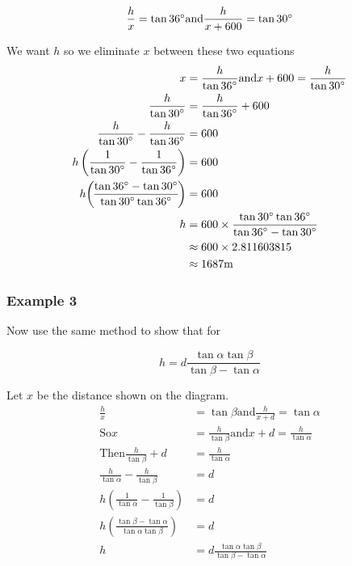 \begin{equation*}\frac{h}{x} =\tan  36 \mbox{{\ensuremath{{}^\circ}}}\text{and}\frac{h}{x +600} =\tan  30 \mbox{{\ensuremath{{}^\circ}}}
\end{equation*}

We want $h$ so we eliminate $x$ between these two equations
\begin{align*}x &  =  \frac{h}{\tan  36 \mbox{{\ensuremath{{}^\circ}}}}\text{and}x +600 =\frac{h}{\tan  30 \mbox{{\ensuremath{{}^\circ}}}} \\
\frac{h}{\tan  30 \mbox{{\ensuremath{{}^\circ}}}} &  =  \frac{h}{\tan  36 \mbox{{\ensuremath{{}^\circ}}}} +600 \\
\frac{h}{\tan  30 \mbox{{\ensuremath{{}^\circ}}}} -\frac{h}{\tan  36 \mbox{{\ensuremath{{}^\circ}}}} &  =  600 \\
h \left (\frac{1}{\tan  30 \mbox{{\ensuremath{{}^\circ}}}} -\frac{1}{\tan  36 \mbox{{\ensuremath{{}^\circ}}}}\right ) &  =  600 \\
h \genfrac{(}{)}{}{}{\tan  36 \mbox{{\ensuremath{{}^\circ}}} -\tan  30 \mbox{{\ensuremath{{}^\circ}}}}{\tan  30 \mbox{{\ensuremath{{}^\circ}}} \tan  36 \mbox{{\ensuremath{{}^\circ}}}} &  =  600 \\
h &  =  600 \times \frac{\tan  30 \mbox{{\ensuremath{{}^\circ}}} \tan  36 \mbox{{\ensuremath{{}^\circ}}}}{\tan  36 \mbox{{\ensuremath{{}^\circ}}} -\tan  30 \mbox{{\ensuremath{{}^\circ}}}} \\
 &  \approx   600 \times 2.811603815 \\
 &  \approx   1687 \mbox{m}\end{align*}

\subsubsection{Example 3}
Now use the same method to show that for 
  
\setlength\fboxrule{0in}\setlength\fboxsep{0.2in}
\begin{equation*}h =d \frac{\tan  \alpha  \tan  \beta }{\tan  \beta  -\tan  \alpha }
\end{equation*}

Let $x$ be the distance shown on the diagram.
\begin{align*}\frac{h}{x} &  =  \tan  \beta \text{and}\frac{h}{x +d} =\tan  \alpha  \\
\text{So}x &  =  \frac{h}{\tan  \beta }\text{and}x +d =\frac{h}{\tan  \alpha } \\
\text{Then}\frac{h}{\tan  \beta } +d &  =  \frac{h}{\tan  \alpha } \\
\frac{h}{\tan  \alpha } -\frac{h}{\tan  \beta } &  =  d \\
h \left (\frac{1}{\tan  \alpha } -\frac{1}{\tan  \beta }\right ) &  =  d \\
h \genfrac{(}{)}{}{}{\tan  \beta  -\tan  \alpha }{\tan  \alpha  \tan  \beta } &  =  d \\
h &  =  d \frac{\tan  \alpha  \tan  \beta }{\tan  \beta  -\tan  \alpha }\end{align*}

